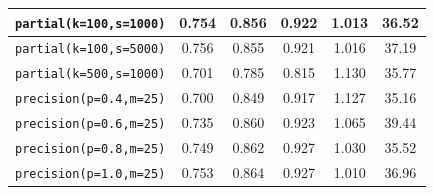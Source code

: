 \begin{table}[]
{\begin{tabular}{|c|c|c|c|c|c|}
\texttt{partial(k=100,s=1000)} & 0.754 & 0.856 & 0.922 & 1.013 & 36.52 \\ \hline
\texttt{partial(k=100,s=5000)} & 0.756 & 0.855 & 0.921 & 1.016 & 37.19 \\ \hline
\texttt{partial(k=500,s=1000)} & 0.701 & 0.785 & 0.815 & 1.130 & 35.77 \\ \hline
\hline
\texttt{precision(p=0.4,m=25)} & 0.700 & 0.849 & 0.917 & 1.127 & 35.16 \\ \hline
\texttt{precision(p=0.6,m=25)} & 0.735 & 0.860 & 0.923 & 1.065 & 39.44 \\ \hline
\texttt{precision(p=0.8,m=25)} & 0.749 & 0.862 & 0.927 & 1.030 & 35.52 \\ \hline
\texttt{precision(p=1.0,m=25)} & 0.753 & 0.864 & 0.927 & 1.010 & 36.96 \\ \hline
\end{tabular}
}
\end{table}

